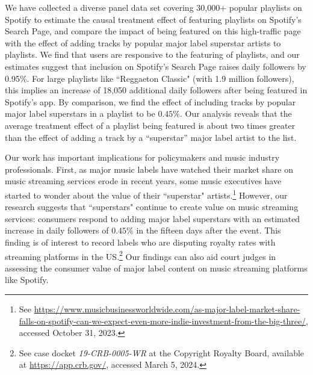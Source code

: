 \documentclass[12pt, a4paper, leqno]{article}
\begin{document}
We have collected a diverse panel data set covering 30,000+ popular playlists on Spotify to estimate the causal treatment effect of featuring playlists on Spotify's Search Page, and compare the impact of being featured on this high-traffic page with the effect of adding tracks by popular major label superstar artists to playlists. We find that users are responsive to the featuring of playlists, and our estimates suggest that inclusion on Spotify's Search Page raises daily followers by 0.95\%. For large playlists like ``Reggaeton Classic" (with 1.9 million followers), this implies an increase of 18,050 additional daily followers after being featured in Spotify's app. By comparison, we find the effect of including tracks by popular major label superstars in a playlist to be $0.45\%$. Our analysis reveals that the average treatment effect of a playlist being featured is about two times greater than the effect of adding a track by a ``superstar” major label artist to the list. 

Our work has important implications for policymakers and music industry professionals.
First, as major music labels have watched their market share on music streaming services erode in recent years, some music executives have started to wonder about the value of their ``superstar" artists.\footnote{See \href{https://www.musicbusinessworldwide.com/as-major-label-market-share-falls-on-spotify-can-we-expect-even-more-indie-investment-from-the-big-three/}{https://www.musicbusinessworldwide.com/as-major-label-market-share-falls-on-spotify-can-we-expect-even-more-indie-investment-from-the-big-three/}, accessed October 31, 2023.} 
However, our research suggests that ``superstars" continue to create value on music streaming services: consumers respond to adding major label superstars with an estimated increase in daily followers of $0.45\%$ in the fifteen days after the event. This finding is of interest to record labels who are disputing royalty rates with streaming platforms in the US.\footnote{See case docket \textit{19-CRB-0005-WR} at the Copyright Royalty Board, available at \href{https://app.crb.gov/case/detail/19-CRB-0005-WR\%20\%282021-2025\%29}{https://app.crb.gov/}, accessed March 5, 2024.} Our findings can also aid court judges in assessing the consumer value of major label content on music streaming platforms like Spotify.
\end{document}
